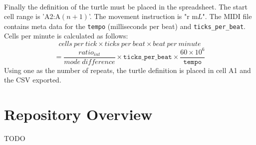 \paragraph{} Finally the definition of the turtle must be placed in the spreadsheet. The start cell range is 'A2:A$(n+1)$'. The movement instruction is "r m$L$". The MIDI file contains meta data for the \texttt{tempo} (milliseconds per beat) and \texttt{ticks\_per\_beat}. Cells per minute is calculated as follows:
  $$cells\ per\ tick \times ticks\ per\ beat \times beat\ per\ minute$$
  $$= \frac{ratio_{int}}{mode\ difference} \times \texttt{ticks\_per\_beat} \times \frac{60 \times 10^6}{\texttt{tempo}}$$
Using one as the number of repeats, the turtle definition is placed in cell A1 and the CSV exported.

\section{Repository Overview}

TODO

